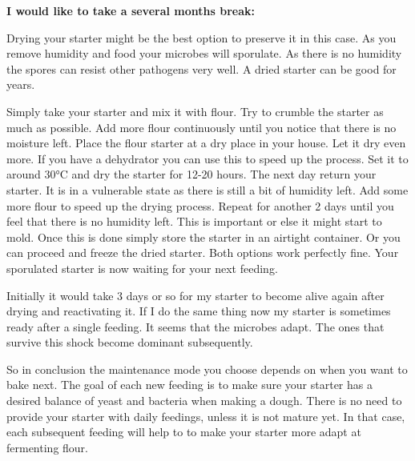 \textbf{I would like to take a several months break:}

Drying your starter might be the best option to preserve it in this case. As
you remove humidity and food your microbes will sporulate. As there is no
humidity the spores can resist other pathogens very well. A dried starter can
be good for years.

Simply take your starter and mix it with flour. Try to crumble the starter as
much as possible. Add more flour continuously until you notice that there is no
moisture left. Place the flour starter at a dry place in your house. Let it
dry even more. If you have a dehydrator you can use this to speed up the
process. Set it to around 30°C and dry the starter for 12-20 hours. The next
day return your starter. It is in a vulnerable state as there is still a bit
of humidity left. Add some more flour to speed up the drying process. Repeat
for another 2 days until you feel that there is no humidity left. This is
important or else it might start to mold. Once this is done simply store the
starter in an airtight container. Or you can proceed and freeze
the dried starter. Both options work perfectly fine. Your sporulated starter
is now waiting for your next feeding.

Initially it would take 3 days or so for my starter to become alive again
after drying and reactivating it. If I do the same thing now my starter is
sometimes ready after a single feeding. It seems that the microbes adapt. The ones
that survive this shock become dominant subsequently.

So in conclusion the maintenance mode you choose depends on when you want to bake next.
The goal of each new feeding is to make sure your starter
has a desired balance of yeast and bacteria when making a dough. There is no need to provide your
starter with daily feedings, unless it is not mature yet. In that case, each
subsequent feeding will help to to make your starter more adapt at fermenting
flour.

